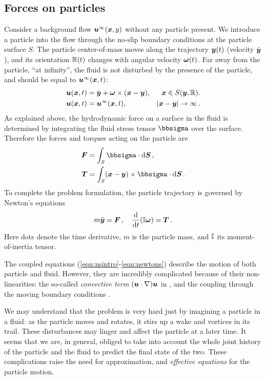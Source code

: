 \documentclass[thesis.tex]{subfiles}
\begin{document}
\subsection{Forces on particles}

Consider a background flow $\mbox{\boldmath$u$}^\infty(\mbox{\boldmath$x$},y)$ without any particle present. We introduce a particle into the flow through the no-slip boundary conditions at the particle surface $S$. The particle center-of-mass moves along the trajectory $\mbox{\boldmath$y$}(t)$ (velocity $\dot{\mbox{\boldmath$y$}}$), and its orientation $\mathbb{R}(t)$ changes with angular velocity $\mbox{\boldmath$\omega$}(t)$.  Far away from the particle, ``at infinity'', the fluid is not disturbed by the presence of the particle, and should be equal to $\mbox{\boldmath$u$}^\infty(\mbox{\boldmath$x$},t)$:
\begin{align}
    \ve u(\ve x, t) &= \dot{\ve y} + \ve \omega \cross (\ve x - \ve y), & \ve x \in S(\ve y, \ma R). \nn\\
    \ve u(\ve x, t) &= \ve u^\infty(\ve x, t), & |\ve x-\ve y|\to\infty\,.\eqnlab{nsbc}
\end{align}
As explained above, the hydrodynamic force on a surface in the fluid is determined by integrating the fluid stress tensor $\bbsigma$ over the surface. Therefore the forces and torques acting on the particle are
\begin{align}
    \ve F &= \int_S \bbsigma \cdot \rd \ve S\,, \nn\\
    \ve T &= \int_S (\ve x - \ve y) \cross \bbsigma \cdot \rd \ve S\,. \eqnlab{nsforces}
\end{align}
To complete the problem formulation, the particle trajectory is governed by Newton's equations
\begin{align}
    m\ddot{\ve y} = \ve F\,, \quad \diff{}{t}(\ma I \ve \omega) = \ve T\,. \eqnlab{newtons}
\end{align}
Here dots denote the time derivative, $m$ is the particle mass, and $\mathbb{I}$ its moment-of-inertia tensor.

The coupled equations (\ref{eqn:nsintro}-\ref{eqn:newtons}) describe the motion of both particle and fluid. However, they are incredibly complicated because of their non-linearities: the so-called \emph{convective term} $(\mbox{\boldmath$u$} \cdot \nabla) \mbox{\boldmath$u$}$ in , and the coupling through the moving boundary conditions .

We may understand that the problem is very hard just by imagining a particle in a fluid: as the particle moves and rotates, it stirs up a wake and vortices in its trail. These disturbances may linger and affect the particle at a later time. It seems that we are, in general, obliged to take into account the whole joint history of the particle and the fluid to predict the final state of the two. These complications raise the need for approximation, and \emph{effective equations} for the particle motion.
\end{document}
